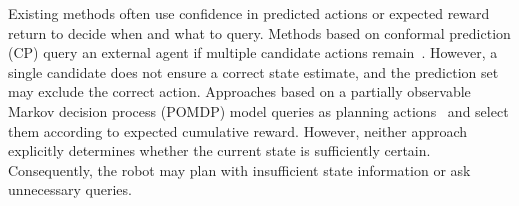 Existing methods often use confidence in predicted actions or expected reward return to decide when and what to query. Methods based on conformal prediction (CP) query an external agent if multiple candidate actions remain~\citep{ren2023robots,liang2024introspective}. However, a single candidate does not ensure a correct state estimate, and the prediction set may exclude the correct action. Approaches based on a partially observable Markov decision process (POMDP) model queries as planning actions~\citep{burks2021collaborative,burks2023harps} and select them according to expected cumulative reward. However, neither approach explicitly determines whether the current state is sufficiently certain. Consequently, the robot may plan with insufficient state information or ask unnecessary queries.


